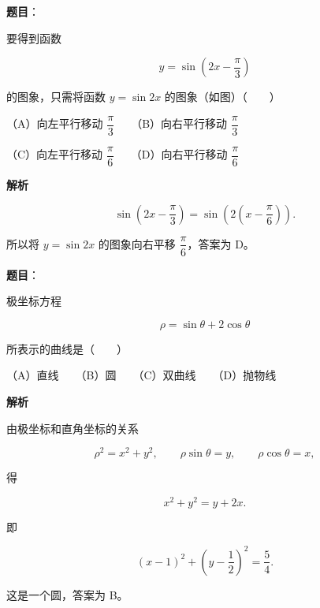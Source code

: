 \begin{answer}

\textbf{题目}：

要得到函数

\nopagebreak[4]
\[
y=\sin\left(2x-\frac\pi3\right)
\]

的图象，只需将函数 $y=\sin2x$ 的图象（如图）\mbox{（　　）}
\nopagebreak[4]
\begin{center}\end{center}
\nopagebreak[4]
（A）向左平行移动 $\dfrac\pi3$　　（B）向右平行移动 $\dfrac\pi3$

（C）向左平行移动 $\dfrac\pi6$　　（D）向右平行移动 $\dfrac\pi6$

\textbf{解析}

\nopagebreak[4]
\[
\sin\left(2x-\frac\pi3\right)
=\sin\left(2\left(x-\frac\pi6\right)\right).
\]

所以将 $y=\sin2x$ 的图象向右平移 $\dfrac\pi6$，答案为 D。


\end{answer}
\begin{answer}

\textbf{题目}：

极坐标方程

\nopagebreak[4]
\[
\rho=\sin\theta+2\cos\theta
\]

所表示的曲线是\mbox{（　　）}

（A）直线　　（B）圆　　（C）双曲线　　（D）抛物线

\textbf{解析}

由极坐标和直角坐标的关系

\nopagebreak[4]
\[
\rho^2=x^2+y^2,\qquad \rho\sin\theta=y,\qquad \rho\cos\theta=x,
\]

得

\nopagebreak[4]
\[
x^2+y^2=y+2x.
\]

即

\nopagebreak[4]
\[
(x-1)^2+\left(y-\frac12\right)^2=\frac54.
\]

这是一个圆，答案为 B。


\end{answer}
